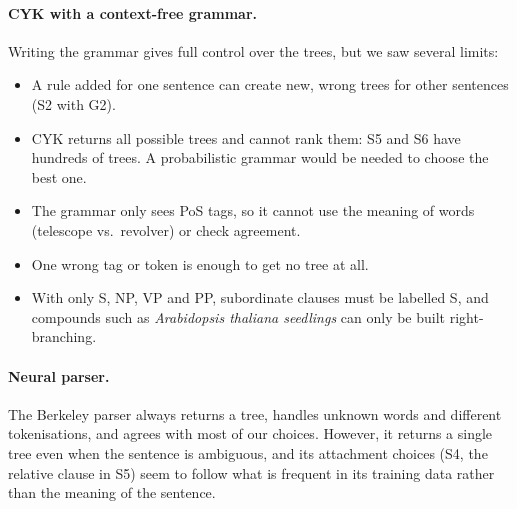 \documentclass[11pt,a4paper]{article}
\begin{document}
\paragraph{CYK with a context-free grammar.} Writing the grammar gives full control over the trees, but we saw several limits:
\begin{itemize}
  \item A rule added for one sentence can create new, wrong trees for other sentences (S2 with G2).
  \item CYK returns all possible trees and cannot rank them: S5 and S6 have hundreds of trees. A probabilistic grammar would be needed to choose the best one.
  \item The grammar only sees PoS tags, so it cannot use the meaning of words (telescope vs.\ revolver) or check agreement.
  \item One wrong tag or token is enough to get no tree at all.
  \item With only S, NP, VP and PP, subordinate clauses must be labelled S, and compounds such as \emph{Arabidopsis thaliana seedlings} can only be built right-branching.
\end{itemize}

\paragraph{Neural parser.} The Berkeley parser always returns a tree, handles unknown words and different tokenisations, and agrees with most of our choices. However, it returns a single tree even when the sentence is ambiguous, and its attachment choices (S4, the relative clause in S5) seem to follow what is frequent in its training data rather than the meaning of the sentence.
\end{document}
